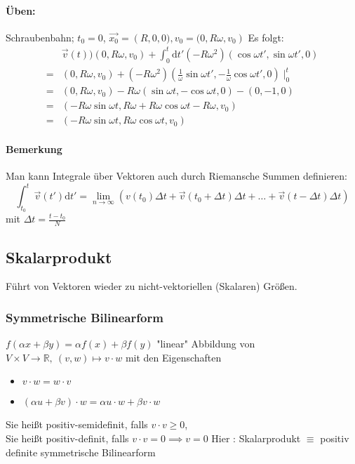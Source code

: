\documentclass[a4paper]{scrartcl}
\theoremstyle{definition}
\theoremstyle{plain}
\theoremstyle{remark}
\theoremstyle{remark}
\begin{document}
\paragraph{Üben:}
\label{sec-2-5-1-2}
Schraubenbahn; $t_0 = 0$, $\vec{x_0} = \left(R, 0, 0), v_0 = (0, R\omega, v_0\right)$
Es folgt:
\begin{align*}
&\vec{v}(t) ) (0, R\omega, v_0) + \int_0^t \mathrm{d}t' ( -R\omega^2)(\cos{\omega t', \sin{\omega t'}, 0})\\
=& (0, R\omega, v_0) + (-R\omega^2)(\frac{1}{\omega}\sin{\omega t'}, -\frac{1}{\omega}\cos{\omega t'}, 0)\mid_0^t\\
=& (0, R\omega, v_0) - R\omega (\sin{\omega t}, -\cos{\omega t}, 0) - (0, -1, 0)\\
=& (-R\omega\sin{\omega t}, R\omega + R\omega\cos{\omega t} - R\omega, v_0)\\
=& (-R\omega\sin{\omega t}, R\omega\cos{\omega t}, v_0)
\end{align*}
\paragraph{Bemerkung}
\label{sec-2-5-1-3}
Man kann Integrale über Vektoren auch durch Riemansche Summen definieren:
\[\int_{t_0}^t \vec{v}(t')\mathrm{d}t' = \lim_{n\to\infty} (v(t_0)\Delta t + \vec{v}(t_0 + \Delta t)\Delta t + \ldots + \vec{v}(t - \Delta t)\Delta t)\]
mit $\Delta t = \frac{t - t_0}{N}$
\subsection{Skalarprodukt}
\label{sec-2-6}
Führt von Vektoren wieder zu nicht-vektoriellen (Skalaren) Größen.
\subsubsection{Symmetrische Bilinearform}
\label{sec-2-6-1}
$f(\alpha x + \beta y) = \alpha f(x) + \beta f(y)$ "linear"
Abbildung von $V\times V \to \mathbb{R},~(v,w) \mapsto v\cdot w$ mit den Eigenschaften
\begin{itemize}
\item $v\cdot w = w\cdot v$
\item $(\alpha u + \beta v) \cdot w = \alpha u\cdot w + \beta v\cdot w$
\end{itemize}
Sie heißt positiv-semidefinit, falls  $v\cdot v\geq 0$, \\
    Sie heißt positiv-definit, falls  $v\cdot v = 0 \implies v = 0$
Hier : Skalarprodukt $\equiv$ positiv definite symmetrische Bilinearform
\end{document}
